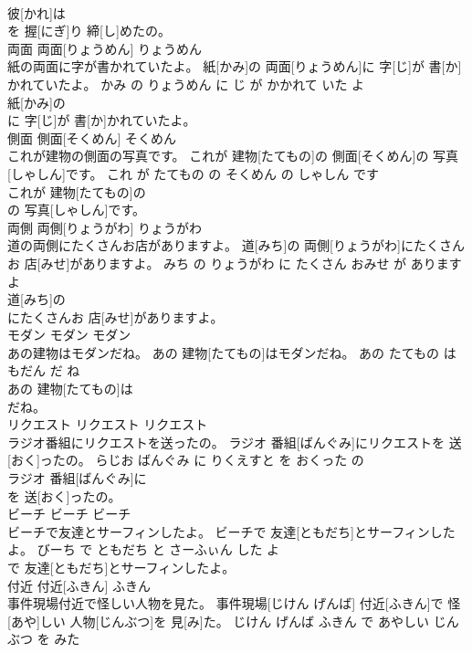 \documentclass[8pt]{extreport}
\begin{document}
\begin{CJK}{UTF8}{min}
\\	彼[かれ]は
\\	を 握[にぎ]り 締[し]めたの。			
\\	両面	両面[りょうめん]	りょうめん	
\\	紙の両面に字が書かれていたよ。	紙[かみ]の 両面[りょうめん]に 字[じ]が 書[か]かれていたよ。	かみ の りょうめん に じ が かかれて いた よ	
\\	紙[かみ]の
\\	に 字[じ]が 書[か]かれていたよ。			
\\	側面	側面[そくめん]	そくめん	
\\	これが建物の側面の写真です。	これが 建物[たてもの]の 側面[そくめん]の 写真[しゃしん]です。	これ が たてもの の そくめん の しゃしん です	
\\	これが 建物[たてもの]の
\\	の 写真[しゃしん]です。			
\\	両側	両側[りょうがわ]	りょうがわ	
\\	道の両側にたくさんお店がありますよ。	道[みち]の 両側[りょうがわ]にたくさんお 店[みせ]がありますよ。	みち の りょうがわ に たくさん おみせ が あります よ	
\\	道[みち]の
\\	にたくさんお 店[みせ]がありますよ。			
\\	モダン	モダン	モダン	
\\	あの建物はモダンだね。	あの 建物[たてもの]はモダンだね。	あの たてもの は もだん だ ね	
\\	あの 建物[たてもの]は
\\	だね。			
\\	リクエスト	リクエスト	リクエスト	
\\	ラジオ番組にリクエストを送ったの。	ラジオ 番組[ばんぐみ]にリクエストを 送[おく]ったの。	らじお ばんぐみ に りくえすと を おくった の	
\\	ラジオ 番組[ばんぐみ]に
\\	を 送[おく]ったの。			
\\	ビーチ	ビーチ	ビーチ	
\\	ビーチで友達とサーフィンしたよ。	ビーチで 友達[ともだち]とサーフィンしたよ。	びーち で ともだち と さーふぃん した よ	
\\	で 友達[ともだち]とサーフィンしたよ。			
\\	付近	付近[ふきん]	ふきん	
\\	事件現場付近で怪しい人物を見た。	事件現場[じけん げんば] 付近[ふきん]で 怪[あや]しい 人物[じんぶつ]を 見[み]た。	じけん げんば ふきん で あやしい じんぶつ を みた	

\end{CJK}
\end{document}

